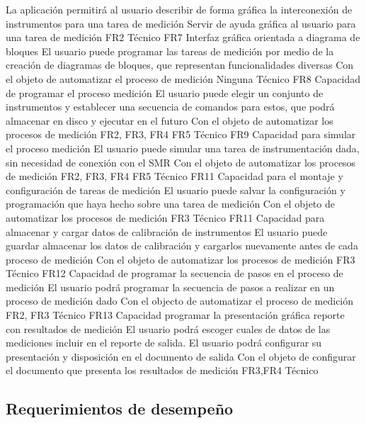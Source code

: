 \documentclass[paper=a4,oneside,fontsize=12pt]{article}
\newcommand{\SMR}{SMR\xspace}
\begin{document}
			{La aplicación permitirá al usuario describir de forma gráfica la interconexión de instrumentos para una tarea de medición}
			{Servir de ayuda gráfica al usuario para una tarea de medición}
			{FR2}
			{Técnico}
		{FR7}
			{Interfaz gráfica orientada a diagrama de bloques}
			{El usuario puede programar las tareas de medición por medio de la creación de diagramas de bloques, que representan funcionalidades diversas}
			{Con el objeto de automatizar el proceso de medición}	
			{Ninguna}		
			{Técnico}				
		{FR8}
			{Capacidad de programar el proceso medición}
			{El usuario puede elegir un conjunto de instrumentos y establecer una secuencia de comandos para estos, que podrá almacenar en disco y ejecutar en el futuro}
			{Con el objeto de automatizar los procesos de medición}
			{FR2, FR3, FR4 FR5}
			{Técnico}	
		{FR9}
			{Capacidad para simular el proceso medición}
			{El usuario puede simular una tarea de instrumentación dada, sin necesidad de conexión con el \SMR}
			{Con el objeto de automatizar los procesos de medición}
			{FR2, FR3, FR4 FR5}
			{Técnico}			
		{FR11}
			{Capacidad para el montaje y configuración de tareas de medición}
			{El usuario puede salvar la configuración y programación que haya hecho sobre una tarea de medición}
			{Con el objeto de automatizar los procesos de medición}
			{FR3}
			{Técnico}								
		{FR11}
			{Capacidad para almacenar y cargar datos de calibración de instrumentos}
			{El usuario puede guardar almacenar los datos de calibración y cargarlos nuevamente antes de cada proceso de medición}
			{Con el objeto de automatizar los procesos de medición}
			{FR3}
			{Técnico}
		{FR12}
			{Capacidad de programar la secuencia de pasos en el proceso de medición}
			{El usuario podrá programar la secuencia de pasos a realizar en un proceso de medición dado}
			{Con el objecto de automatizar el proceso de medición}
			{FR2, FR3}	
			{Técnico}		
		{FR13}
			{Capacidad programar la presentación gráfica reporte con resultados de medición}
			{El usuario podrá escoger cuales de datos de las mediciones incluir en el reporte de salida. El usuario podrá configurar su presentación y disposición en el documento de salida}
			{Con el objeto de configurar el documento que presenta los resultados de medición}
			{FR3,FR4}
			{Técnico}		
			
	\subsection{Requerimientos de desempeño}	
	
\end{document}
